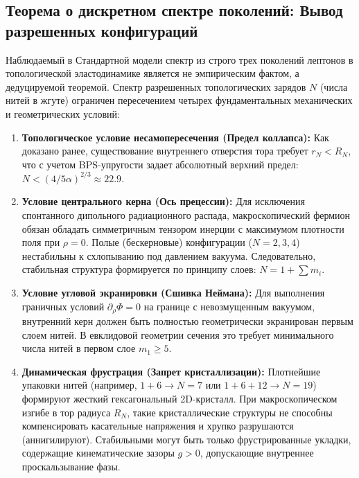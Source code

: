 \documentclass[11pt,a4paper]{article}
\begin{document}
\subsection{Теорема о дискретном спектре поколений: Вывод разрешенных конфигураций}
Наблюдаемый в Стандартной модели спектр из строго трех поколений лептонов в топологической эластодинамике является не эмпирическим фактом, а дедуцируемой теоремой. Спектр разрешенных топологических зарядов $N$ (числа нитей в жгуте) ограничен пересечением четырех фундаментальных механических и геометрических условий:

\begin{enumerate}
	\item \textbf{Топологическое условие несамопересечения (Предел коллапса):} Как доказано ранее, существование внутреннего отверстия тора требует $r_N < R_N$, что с учетом BPS-упругости задает абсолютный верхний предел: $N < (4 / 5\alpha)^{2/3} \approx 22.9$.
	
	\item \textbf{Условие центрального керна (Ось прецессии):} Для исключения спонтанного дипольного радиационного распада, макроскопический фермион обязан обладать симметричным тензором инерции с максимумом плотности поля при $\rho = 0$. Полые (бескерновые) конфигурации ($N=2, 3, 4$) нестабильны к схлопыванию под давлением вакуума. Следовательно, стабильная структура формируется по принципу слоев: $N = 1 + \sum m_i$.
	
	\item \textbf{Условие угловой экранировки (Сшивка Неймана):} Для выполнения граничных условий $\partial_\rho \Phi = 0$ на границе с невозмущенным вакуумом, внутренний керн должен быть полностью геометрически экранирован первым слоем нитей. В евклидовой геометрии сечения это требует минимального числа нитей в первом слое $m_1 \ge 5$.
	
	\item \textbf{Динамическая фрустрация (Запрет кристаллизации):} Плотнейшие упаковки нитей (например, $1+6 \to N=7$ или $1+6+12 \to N=19$) формируют жесткий гексагональный 2D-кристалл. При макроскопическом изгибе в тор радиуса $R_N$, такие кристаллические структуры не способны компенсировать касательные напряжения и хрупко разрушаются (аннигилируют). Стабильными могут быть только фрустрированные укладки, содержащие кинематические зазоры $g > 0$, допускающие внутреннее проскальзывание фазы.
\end{enumerate}
\end{document}
